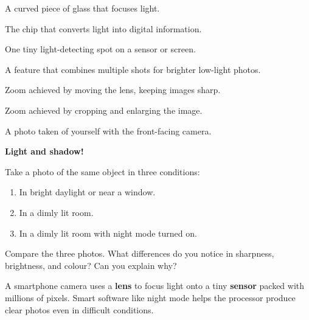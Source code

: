 \begin{newwords}
  \begin{description}[labelwidth=3.5cm, leftmargin=3.7cm]
    \item[\term{Lens}]           A curved piece of glass that focuses light.
    \item[\term{Camera sensor}]  The chip that converts light into digital information.
    \item[\term{Pixel}]          One tiny light-detecting spot on a sensor or screen.
    \item[\term{Night mode}]     A feature that combines multiple shots for brighter low-light photos.
    \item[\term{Optical zoom}]   Zoom achieved by moving the lens, keeping images sharp.
    \item[\term{Digital zoom}]   Zoom achieved by cropping and enlarging the image.
    \item[\term{Selfie}]         A photo taken of yourself with the front-facing camera.
  \end{description}
\end{newwords}

\sectionrule

\begin{experiment}
  \textbf{Light and shadow!}

  Take a photo of the same object in three conditions:
  \begin{enumerate}[label=\textbf{\arabic*.}]
    \item In bright daylight or near a window.
    \item In a dimly lit room.
    \item In a dimly lit room with night mode turned on.
  \end{enumerate}
  Compare the three photos. What differences do you notice in sharpness,
  brightness, and colour? Can you explain why?
\end{experiment}

\sectionrule

\begin{bigidea}
  A smartphone camera uses a \textbf{lens} to focus light onto a tiny
  \textbf{sensor} packed with millions of pixels.
  Smart software like night mode helps the processor
  produce clear photos even in difficult conditions.
\end{bigidea}

